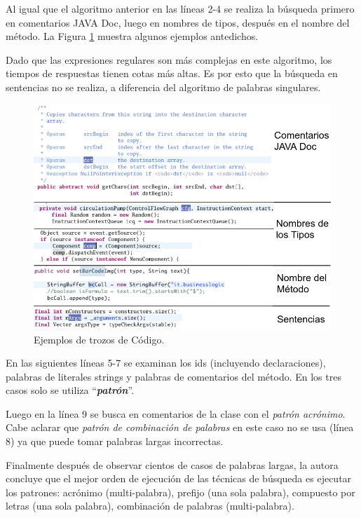 \documentclass[a4paper,12pt]{report}
\begin{document}
Al igual que el algoritmo anterior en las líneas 2-4 se realiza la búsqueda primero en comentarios JAVA Doc, luego en nombres de tipos, después en el nombre del método. La Figura \ref{exp3} muestra algunos ejemplos antedichos.

Dado que las expresiones regulares son más complejas en este algoritmo, los tiempos de respuestas tienen cotas más altas. Es por esto que la búsqueda en sentencias no se realiza, a diferencia del algoritmo de palabras singulares.

\begin{figure}[t] %
\centerline{%
\includegraphics[scale=0.7]{./exp_3.png}
}
\caption{Ejemplos de trozos de Código.}
\label{exp3}
\end{figure}

En las siguientes líneas 5-7 se examinan los ids (incluyendo declaraciones), palabras de literales strings y palabras de comentarios del método. En los tres casos solo se utiliza “\textit{\textbf{patrón}}”.

Luego en la línea 9 se busca en comentarios de la clase con el \textit{patrón acrónimo}. Cabe aclarar que \textit{patrón de combinación de palabras} en este caso no se usa (línea 8) ya que puede tomar palabras largas incorrectas.

Finalmente después de observar cientos de casos de palabras largas, la autora \cite{EZH08} concluye que el mejor orden de ejecución de las técnicas de búsqueda es ejecutar los patrones: acrónimo (multi-palabra), prefijo (una sola palabra), compuesto por letras (una sola palabra), combinación de palabras (multi-palabra).
\end{document}
